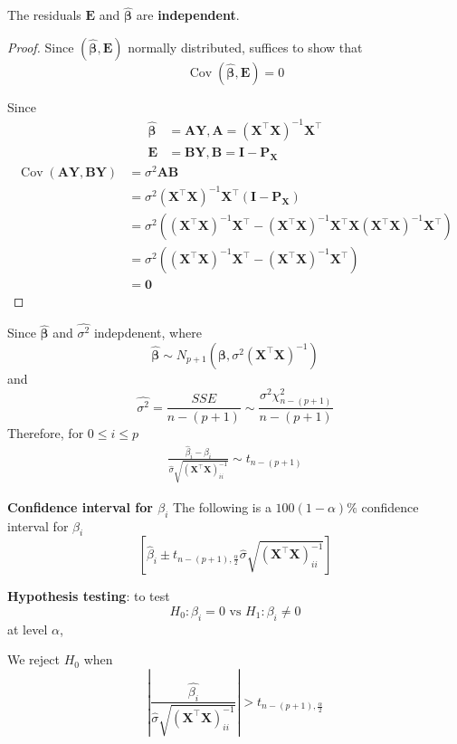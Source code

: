 \begin{result}
    The residuals $\bm{E}$ and $ \hat{ \bm{ \beta}}$ are \textbf{independent}.
\end{result}
\begin{proof}
    Since $ \left( \hat{ \bm{ \beta}}, \bm{E} \right) $ normally distributed, suffices to show that 
    \[
        \operatorname{Cov}  \left( \hat{ \bm{\beta}}, \bm{E} \right)  = 0
    \]

    Since 
    \begin{align*}
        \hat{\bm{\beta}} &= \bm{AY}, \bm{A} = \left( \bm{X}^{\top} \bm{X} \right)^{-1} \bm{X}^{\top} \\
        \bm{E} &= \bm{BY}, \bm{B} = \bm{I - P_X}
    \end{align*}
    \begin{align*}
        \operatorname{Cov} (\bm{AY}, \bm{BY}) &= \sigma^2 \bm{AB} \\
        &= \sigma^2 \left( \bm{X}^{\top} \bm{X}  \right)^{-1} \bm{X}^{\top} \left( \bm{I - P_X} \right)   \\
        &= \sigma^2 \left( 
            \left( \bm{X}^{\top} \bm{X} \right)^{-1} \bm{X}^{\top}  -
            \left( \bm{X}^{\top} \bm{X} \right)^{-1} \bm{X}^{\top} \bm{X} \left( \bm{X}^{\top} \bm{X} \right)^{-1} \bm{X}^{\top} 
         \right)  \\
        &= \sigma^2 \left( 
            \left( \bm{X}^{\top} \bm{X} \right)^{-1} \bm{X}^{\top}  -
            \left( \bm{X}^{\top} \bm{X} \right)^{-1} \bm{X}^{\top}
         \right)  \\
        &= \bm{0}
    \end{align*}
\end{proof}


\begin{result}
    Since $\hat{ \bm{\beta}}$ and $\hat{ \sigma^2}$ indepdenent, where
    \[
        \hat{ \bm{\beta}} \sim N_{p + 1} \left( \bm{\beta}, \sigma^2 \left( \bm{X}^{\top} \bm{X} \right)^{-1}  \right) 
    \]
    and 
    \[
        \hat{ \sigma^2} = \frac{SSE}{n - (p + 1)} \sim \frac{\sigma^2 \chi_{n - (p + 1)}^2}{n - (p + 1)}
    \]
    Therefore, for $0 \leq i \leq p$
    \begin{align*}
        \frac{\hat{\beta}_i - \beta_i}{ \hat{ \sigma} \sqrt{ \left( \bm{X}^{\top} \bm{X} \right)^{-1}_{ii} }} \sim t_{n - (p + 1)}
    \end{align*} 

    \textbf{Confidence interval for $\beta_i$} The following is a $100(1- \alpha)\%$ confidence interval for $\beta_i$
    \[
        \left[ \hat{\beta}_i \pm t_{n - (p + 1), \frac{\alpha}{2}} \hat{\sigma} \sqrt{(\bm{X}^{\top}\bm{X})^{-1}_{ii}} \right] 
    \]

    \textbf{Hypothesis testing}: to test 
    \[
        H_0: \beta_i = 0 \text{ vs } H_1: \beta_i \neq 0
    \]
    at level $\alpha$,
    
    We reject $H_0$ when 
    \[
        \left| \frac{\hat{\beta_i}}{ \hat{\sigma} \sqrt{
            \left( \bm{X}^{\top}\bm{X} \right)^{-1}_{ii}
        }} \right|  > t_{n - (p + 1), \frac{\alpha}{2}}
    \]
\end{result}

